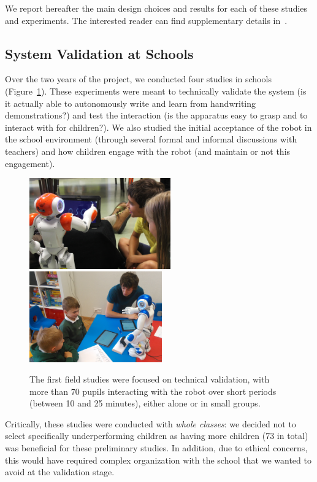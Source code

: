\documentclass{article}
\begin{document}
We report hereafter the main design choices and results for each of these
studies and experiments. The interested reader can find supplementary details
in~\cite{jacq2016building, hood2015when}.

\subsection{System Validation at Schools}
\label{studies_school}

Over the two years of the project, we conducted four studies in schools
(Figure~\ref{fig:schools}). These experiments were meant to technically validate
the system (is it actually able to autonomously write and learn from handwriting
demonstrations?) and test the interaction (is the apparatus easy to grasp and to
interact with for children?). We also studied the initial acceptance of the
robot in the school environment (through several formal and informal discussions
with teachers) and how children engage with the robot (and maintain or not this
engagement).

\begin{figure}
    \centering
    \includegraphics[height=3.9cm]{schools}
    \includegraphics[height=3.9cm]{schools2}
    \caption{\small The first field studies were focused on technical validation, with
    more than 70 pupils interacting with the robot over short periods (between
    10 and 25 minutes), either alone or in small groups.}
    \label{fig:schools}
\end{figure}

Critically, these studies were conducted with \emph{whole classes}: we decided
not to select specifically underperforming children as having more children (73
in total) was beneficial for these preliminary studies. In addition, due to ethical
concerns, this would have required complex organization with the school that we
wanted to avoid at the validation stage.
\end{document}
